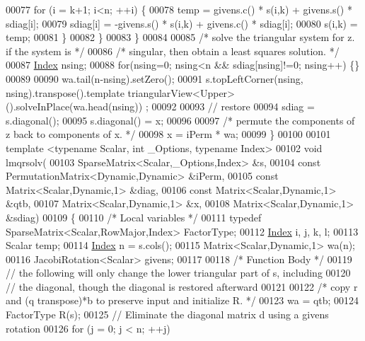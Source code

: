 \begin{DoxyCode}
00077             \textcolor{keywordflow}{for} (i = k+1; i<n; ++i) \{
00078                 temp = givens.c() * s(i,k) + givens.s() * sdiag[i];
00079                 sdiag[i] = -givens.s() * s(i,k) + givens.c() * sdiag[i];
00080                 s(i,k) = temp;
00081             \}
00082         \}
00083     \}
00084   
00085     \textcolor{comment}{/*     solve the triangular system for z. if the system is */}
00086     \textcolor{comment}{/*     singular, then obtain a least squares solution. */}
00087     \hyperlink{namespace_eigen_a62e77e0933482dafde8fe197d9a2cfde}{Index} nsing;
00088     \textcolor{keywordflow}{for}(nsing=0; nsing<n && sdiag[nsing]!=0; nsing++) \{\}
00089 
00090     wa.tail(n-nsing).setZero();
00091     s.topLeftCorner(nsing, nsing).transpose().template triangularView<Upper>().solveInPlace(wa.head(nsing))
      ;
00092   
00093     \textcolor{comment}{// restore}
00094     sdiag = s.diagonal();
00095     s.diagonal() = x;
00096 
00097     \textcolor{comment}{/* permute the components of z back to components of x. */}
00098     x = iPerm * wa; 
00099 \}
00100 
00101 \textcolor{keyword}{template} <\textcolor{keyword}{typename} Scalar, \textcolor{keywordtype}{int} \_Options, \textcolor{keyword}{typename} Index>
00102 \textcolor{keywordtype}{void} lmqrsolv(
00103   SparseMatrix<Scalar,\_Options,Index> &s,
00104   \textcolor{keyword}{const} PermutationMatrix<Dynamic,Dynamic> &iPerm,
00105   \textcolor{keyword}{const} Matrix<Scalar,Dynamic,1> &diag,
00106   \textcolor{keyword}{const} Matrix<Scalar,Dynamic,1> &qtb,
00107   Matrix<Scalar,Dynamic,1> &x,
00108   Matrix<Scalar,Dynamic,1> &sdiag)
00109 \{
00110   \textcolor{comment}{/* Local variables */}
00111   \textcolor{keyword}{typedef} SparseMatrix<Scalar,RowMajor,Index> FactorType;
00112     \hyperlink{namespace_eigen_a62e77e0933482dafde8fe197d9a2cfde}{Index} i, j, k, l;
00113     Scalar temp;
00114     \hyperlink{namespace_eigen_a62e77e0933482dafde8fe197d9a2cfde}{Index} n = s.cols();
00115     Matrix<Scalar,Dynamic,1>  wa(n);
00116     JacobiRotation<Scalar> givens;
00117 
00118     \textcolor{comment}{/* Function Body */}
00119     \textcolor{comment}{// the following will only change the lower triangular part of s, including}
00120     \textcolor{comment}{// the diagonal, though the diagonal is restored afterward}
00121 
00122     \textcolor{comment}{/*     copy r and (q transpose)*b to preserve input and initialize R. */}
00123     wa = qtb;
00124     FactorType R(s);
00125     \textcolor{comment}{// Eliminate the diagonal matrix d using a givens rotation}
00126     \textcolor{keywordflow}{for} (j = 0; j < n; ++j)

\end{DoxyCode}
